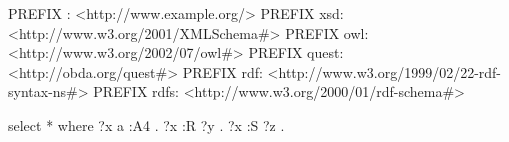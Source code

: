 PREFIX : <http://www.example.org/>
PREFIX xsd: <http://www.w3.org/2001/XMLSchema#>
PREFIX owl: <http://www.w3.org/2002/07/owl#>
PREFIX quest: <http://obda.org/quest#>
PREFIX rdf: <http://www.w3.org/1999/02/22-rdf-syntax-ns#>
PREFIX rdfs: <http://www.w3.org/2000/01/rdf-schema#>

select * where {
?x a  :A4 .
?x :R ?y .
?x :S ?z .
}